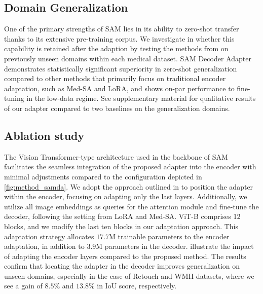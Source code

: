 \subsection{Domain Generalization}
One of the primary strengths of SAM lies in its ability to zero-shot transfer thanks to its extensive pre-training corpus. We investigate in  whether this capability is retained after the adaption by testing the methods from  on previously unseen domains within each medical dataset. SAM Decoder Adapter demonstrates statistically significant superiority in zero-shot generalization compared to other methods that primarily focus on traditional encoder adaptation, such as Med-SA and LoRA, and shows on-par performance to fine-tuning in the low-data regime. See supplementary material for qualitative results of our adapter compared to two baselines on the generalization domains.

\subsection{Ablation study}\label{sec:ablation_samda}
The Vision Transformer-type architecture used in the backbone of SAM facilitates the seamless integration of the proposed adapter into the encoder with minimal adjustments compared to the configuration depicted in \cref{fig:method_samda}. We adopt the approach outlined in  to position the adapter within the encoder, focusing on adapting only the last layers. Additionally, we utilize all image embeddings as queries for the attention module and fine-tune the decoder, following the setting from LoRA and Med-SA. ViT-B comprises 12 blocks, and we modify the last ten blocks in our adaptation approach. This adaptation strategy allocates $17.7$M trainable parameters to the encoder adaptation, in addition to $3.9$M parameters in the decoder.  illustrate the impact of adapting the encoder layers compared to the proposed method. The results confirm that locating the adapter in the decoder improves generalization on unseen domains, especially in the case of Retouch and WMH datasets, where we see a gain of $8.5\%$ and $13.8\%$ in IoU score, respectively.





